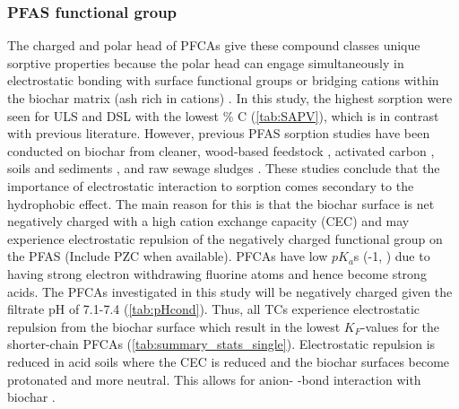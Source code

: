 \subsubsection{PFAS functional group} 
The charged and polar head of PFCAs give these compound classes unique sorptive properties because the polar head can engage simultaneously in electrostatic bonding with surface functional groups or bridging cations within the biochar matrix (ash rich in cations) \citep{zhang2013sorption,sigmund2022sorption}. In this study, the highest sorption were seen for ULS and DSL with the lowest \% C (\cref{tab:SAPV}), which is in contrast with previous literature. However, previous PFAS sorption studies have been conducted on biochar from cleaner, wood-based feedstock \citep{Sormo2021}, activated carbon \citep{zhang2021sorption,Kupryianchyk2016b}, soils and sediments \citep{higgins2006sorption}, and raw sewage sludges \citep{zhang2013sorption}. These studies conclude that the importance of electrostatic interaction to sorption comes secondary to the hydrophobic effect. The main reason for this is that the biochar surface is net negatively charged with a high cation exchange capacity (CEC) \citep{Ahmad2014} and may experience electrostatic repulsion of the negatively charged functional group on the PFAS (Include PZC when available). PFCAs have low $pK_a$s (-1, \citep{goss2008pKa}) due to having strong electron withdrawing fluorine atoms and hence become strong acids. The PFCAs investigated in this study will be negatively charged given the filtrate pH of 7.1-7.4 (\cref{tab:pHcond}). Thus, all TCs experience electrostatic repulsion from the biochar surface which result in the lowest $K_F$-values for the shorter-chain PFCAs (\cref{tab:summary_stats_single}). Electrostatic repulsion is reduced in acid soils where the CEC is reduced and the biochar surfaces become protonated and more neutral. This allows for anion- \textpi-bond interaction with biochar \citep{sigmund2022sorption}. 

